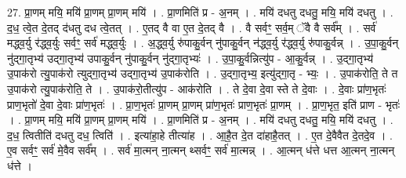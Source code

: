 \documentclass[17pt]{extarticle}
\begin{document}
27. प्रा॒णम् मयि॒ मयि॑ प्रा॒णम् प्रा॒णम् मयि॑ । . प्रा॒णमिति॑ प्र - अ॒नम् । . मयि॑ दधतु दधतु॒ मयि॒ मयि॑ दधतु । . द॒ध॒ त्वे॒त दे॒तद् द॑धतु दध त्वे॒तत् । . ए॒तद् वै वा ए॒त दे॒तद् वै । . वै सर्वꣳ॒॒ सर्व॒म् ॅवै वै सर्व᳚म् । . सर्व॑ मद्ध्व॒र्यु र॑द्ध्व॒र्युः सर्वꣳ॒॒ सर्व॑ मद्ध्व॒र्युः । . अ॒द्ध्व॒र्यु रु॑पाकु॒र्वन् नु॑पाकु॒र्वन् न॑द्ध्व॒र्यु र॑द्ध्व॒र्यु रु॑पाकु॒र्वन्न् । . उ॒पा॒कु॒र्वन् नु॑द्‍गा॒तृभ्य॑ उद्‍गा॒तृभ्य॑ उपाकु॒र्वन् नु॑पाकु॒र्वन् नु॑द्‍गा॒तृभ्यः॑ । . उ॒पा॒कु॒र्वन्नित्यु॑प - आ॒कु॒र्वन्न् । . उ॒द्‍गा॒तृभ्य॑ उ॒पाक॑रो त्यु॒पाक॑रो त्युद्‍गा॒तृभ्य॑ उद्‍गा॒तृभ्य॑ उ॒पाक॑रोति । . उ॒द्‍गा॒तृभ्य॒ इत्यु॑द्‍गा॒तृ - भ्यः॒ । . उ॒पाक॑रोति॒ ते त उ॒पाक॑रो त्यु॒पाक॑रोति॒ ते । . उ॒पाक॑रो॒तीत्यु॑प - आक॑रोति । . ते दे॒वा दे॒वा स्ते ते दे॒वाः । . दे॒वाः प्रा॑ण॒भृतः॑ प्राण॒भृतो॑ दे॒वा दे॒वाः प्रा॑ण॒भृतः॑ । . प्रा॒ण॒भृतः॑ प्रा॒णम् प्रा॒णम् प्रा॑ण॒भृतः॑ प्राण॒भृतः॑ प्रा॒णम् । . प्रा॒ण॒भृत॒ इति॑ प्राण - भृतः॑ । . प्रा॒णम् मयि॒ मयि॑ प्रा॒णम् प्रा॒णम् मयि॑ । . प्रा॒णमिति॑ प्र - अ॒नम् । . मयि॑ दधतु दधतु॒ मयि॒ मयि॑ दधतु । . द॒ध॒ त्वितीति॑ दधतु दध॒ त्विति॑ । . इत्या॑हा॒हे तीत्या॑ह । . आ॒है॒त दे॒त दा॑हाहै॒तत् । . ए॒त दे॒वैवैत दे॒तदे॒व । . ए॒व सर्वꣳ॒॒ सर्व॑ मे॒वैव सर्व᳚म् । . सर्व॑ मा॒त्मन् ना॒त्मन् थ्सर्वꣳ॒॒ सर्व॑ मा॒त्मन्न् । . आ॒त्मन् ध॑त्ते धत्त आ॒त्मन् ना॒त्मन् ध॑त्ते । \newline
\end{document}
